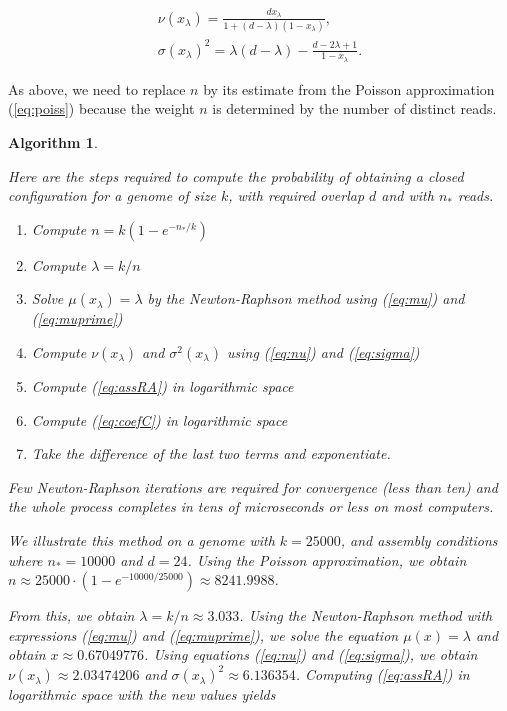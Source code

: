 \documentclass{article}
\newtheorem{algorithm}{Algorithm}
\begin{document}
\begin{gather}
\label{eq:nu} %
\nu(x_\lambda) = \frac{dx_\lambda}{1+(d-\lambda)(1-x_\lambda)}, \\
\label{eq:sigma} %
\sigma(x_\lambda)^2 = \lambda(d-\lambda) -
  \frac{d-2\lambda+1}{1-x_\lambda}.
\end{gather}

As above, we need to replace $n$ by its estimate from the Poisson
approximation (\ref{eq:poiss}) because the weight $n$ is determined by the
number of distinct reads.


\begin{algorithm}
\label{alg:closure}

Here are the steps required to compute the probability of obtaining a
closed configuration for a genome of size $k$, with required overlap $d$
and with $n_*$ reads.

\begin{enumerate}
\item Compute $n = k(1-e^{-n_*/k})$
\item Compute $\lambda = k/n$
\item Solve $\mu(x_\lambda) = \lambda$ by the Newton-Raphson method using
(\ref{eq:mu}) and (\ref{eq:muprime})
\item Compute $\nu(x_\lambda)$ and $\sigma^2(x_\lambda)$ using
(\ref{eq:nu}) and (\ref{eq:sigma})
\item Compute (\ref{eq:assRA}) in logarithmic space
\item Compute (\ref{eq:coefC}) in logarithmic space
\item Take the difference of the last two terms and exponentiate.
\end{enumerate}

Few Newton-Raphson iterations are required for convergence (less than ten)
and the whole process completes in tens of microseconds or less on most
computers.

We illustrate this method on a genome with $k = 25000$, and assembly
conditions where $n_* = 10000$ and $d=24$. Using the Poisson
approximation, we obtain $n \approx 25000 \cdot (1-e^{-10000/25000})
\approx 8241.9988$.

From this, we obtain $\lambda = k/n \approx 3.033$. Using the
Newton-Raphson method with expressions (\ref{eq:mu}) and
(\ref{eq:muprime}), we solve the equation $\mu(x) = \lambda$ and obtain $x
\approx 0.67049776$. Using equations (\ref{eq:nu}) and (\ref{eq:sigma}),
we obtain $\nu(x_\lambda) \approx 2.03474206$ and $\sigma(x_\lambda)^2
\approx 6.136354$. Computing (\ref{eq:assRA}) in logarithmic space with
the new values yields


\end{algorithm}
\end{document}
